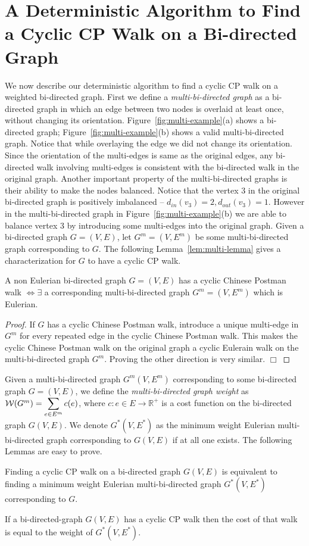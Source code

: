 \documentclass[runningheads]{llncs}
\begin{document}
\section{A Deterministic Algorithm to Find a Cyclic CP Walk on a Bi-directed Graph}
\label{sec:det_algo}
We now describe our deterministic algorithm to find a cyclic CP walk on a weighted bi-directed 
graph. First we define a {\em multi-bi-directed graph} as a bi-directed graph in which an edge between two
nodes is overlaid at least once, without changing its orientation. Figure~\ref{fig:multi-example}(a)
shows a bi-directed graph; Figure~\ref{fig:multi-example}(b) shows a valid multi-bi-directed graph. Notice
that while overlaying the edge we did not change its orientation. Since the orientation of the multi-edges
is same as the original edges, any bi-directed walk involving multi-edges is consistent with the bi-directed
walk in the original graph. Another important property of the multi-bi-directed graphs is their ability to make
the nodes balanced. Notice that the vertex $3$ in the original bi-directed graph is positively imbalanced --
$d_{in}(v_3) = 2, d_{out}(v_3) = 1$. However in the multi-bi-directed graph in Figure~\ref{fig:multi-example}(b)
we are able to balance vertex $3$ by introducing some multi-edges into the original graph. Given a bi-directed
graph $G=(V,E)$, let $G^m=(V,E^m)$ be some multi-bi-directed graph corresponding to $G$. The following 
Lemma~\ref{lem:multi-lemma} gives a characterization for $G$ to have a cyclic CP walk. 
\begin{lemma}
\label{lem:multi-lemma}
A non Eulerian bi-directed graph $G=(V,E)$ has a cyclic Chinese Postman walk $\iff \exists$ a corresponding 
multi-bi-directed graph $G^m=(V,E^m)$ which is Eulerian.
\end{lemma}
\begin{proof}
If $G$ has a cyclic Chinese Postman walk, introduce a unique multi-edge in $G^m$ for every repeated edge in the 
cyclic Chinese Postman walk. This makes the cyclic Chinese Postman walk on the original graph a cyclic Eulerain walk on the
multi-bi-directed graph $G^m$. Proving the other direction is very similar. $\Box$
\end{proof}

Given a multi-bi-directed graph $G^m(V,E^m)$ corresponding to some bi-directed graph $G=(V,E)$, we define the 
{\em multi-bi-directed graph weight} as ${\cal W}(G^m) = \displaystyle\sum_{e\in E^m} c(e)$, where $c : e\in E \rightarrow \mathbb{R^+}$
is a cost function on the bi-directed graph $G(V,E)$.  We denote $G^*(V,E^*)$ as the minimum weight Eulerian multi-bi-directed graph 
corresponding to $G(V,E)$ if at all one exists. The following Lemmas are easy to prove.
\begin{lemma}
\label{lem:reformulate}
Finding a cyclic CP walk on a bi-directed graph $G(V,E)$ is equivalent to finding a minimum weight Eulerian multi-bi-directed graph $G^*(V,E^*)$ corresponding to $G$. 
\end{lemma}
\begin{lemma}
\label{lem:cost}
If a bi-directed-graph $G(V,E)$ has a cyclic CP walk then the cost of that walk is equal to the weight of $G^*(V,E^*)$.
\end{lemma}
\end{document}
